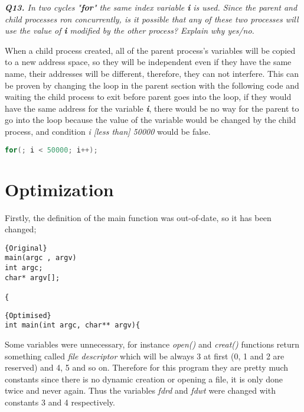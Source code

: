 \documentclass[11pt]{article}
\begin{document}
\vspace{5mm}
\textit{\textbf{Q13.} In two cycles "\textbf{for}" the same index variable \textit{\textbf{i}} is used. Since the parent and child processes ron concurrently, is it possible that any of these two processes will use the value of \textit{\textbf{i}} modified by the other process? Explain why yes/no.}
\vspace{5mm}

When a child process created, all of the parent process's variables will be copied to a new address space, so they will be independent even if they have the same name, their addresses will be different, therefore, they can not interfere. This can be proven by changing the loop in the parent section with the following code and waiting the child process to exit before parent goes into the loop, if they would have the same address for the variable \textit{\textbf{i}}, there would be no way for the parent to go into the loop because the value of the variable would be changed by the child process, and condition \textit{i [less than] 50000} would be false.

\begin{lstlisting}[language=C]
	for(; i < 50000; i++);
\end{lstlisting}

\section*{Optimization}

Firstly, the definition of the main function was out-of-date, so it has been changed;

\noindent\begin{minipage}{.45\textwidth}
\begin{lstlisting}[caption=Original,frame=tlrb]{Original}
main(argc , argv)
int argc; 
char* argv[];

{
\end{lstlisting}
\end{minipage}\hfill
\begin{minipage}{.50\textwidth}
\begin{lstlisting}[caption=Optimised,frame=tlrb]{Optimised}
int main(int argc, char** argv){
\end{lstlisting}
\end{minipage}

Some variables were unnecessary, for instance \textit{open()} and \textit{creat()} functions return something called \textit{file descriptor} which will be always 3 at first (0, 1 and 2 are reserved) and 4, 5 and so on. Therefore for this program they are pretty much constants since there is no dynamic creation or opening a file, it is only done twice and never again. Thus the variables \textit{fdrd} and \textit{fdwt} were changed with constants 3 and 4 respectively.
\end{document}

